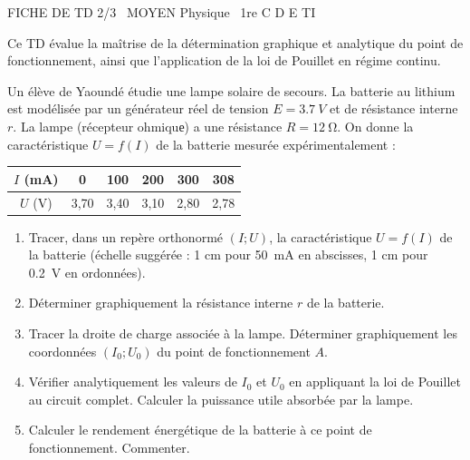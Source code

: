 \documentclass[11pt]{article}
\begin{document}
\begin{tcolorbox}[enhanced,colback=popink,colframe=popink,arc=10pt,boxrule=0pt,left=12pt,right=12pt,top=9pt,bottom=9pt]
{\color{white}\popxbold\small FICHE DE TD 2/3 \textbullet\ MOYEN \hfill Physique \textbullet\ 1re C D E TI\par}
\end{tcolorbox}
\vspace{4pt}
Ce TD évalue la maîtrise de la détermination graphique et analytique du point de fonctionnement, ainsi que l'application de la loi de Pouillet en régime continu.

\begin{exercice}
Un élève de Yaoundé étudie une lampe solaire de secours. La batterie au lithium est modélisée par un générateur réel de tension $E = \SI{3,7}{V}$ et de résistance interne $r$. La lampe (récepteur ohmiquе) a une résistance $R = \SI{12}{\ohm}$. On donne la caractéristique $U = f(I)$ de la batterie mesurée expérimentalement :
\begin{center}
\begin{tabular}{|c|c|c|c|c|c|}
\hline
$I$ (\si{\milli\ampere}) & 0 & 100 & 200 & 300 & 308 \\
\hline $U$ (\si{\volt}) & 3,70 & 3,40 & 3,10 & 2,80 & 2,78 \\
\hline
\end{tabular}
\end{center}
\begin{enumerate}
\item Tracer, dans un repère orthonormé $(I ; U)$, la caractéristique $U = f(I)$ de la batterie (échelle suggérée : 1 cm pour \SI{50}{\milli\ampere} en abscisses, 1 cm pour \SI{0,2}{V} en ordonnées).
\item Déterminer graphiquement la résistance interne $r$ de la batterie.
\item Tracer la droite de charge associée à la lampe. Déterminer graphiquement les coordonnées $(I_0 ; U_0)$ du point de fonctionnement $A$.
\item Vérifier analytiquement les valeurs de $I_0$ et $U_0$ en appliquant la loi de Pouillet au circuit complet. Calculer la puissance utile absorbée par la lampe.
\item Calculer le rendement énergétique de la batterie à ce point de fonctionnement. Commenter.
\end{enumerate}
\end{exercice}
\end{document}
